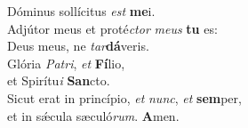 \oddverse Dóminus sollícitus \textit{est} \textbf{me}i.\\
\evenverse Adjútor meus et proté\textit{ctor} \textit{me}\textit{us} \textbf{tu} es:~\*\\
\evenverse Deus meus, ne \textit{tar}\textbf{dá}veris.\\
\oddverse Glória \textit{Pa}\textit{tri}, \textit{et} \textbf{Fí}lio,~\*\\
\oddverse et Spirítu\textit{i} \textbf{San}cto.\\
\evenverse Sicut erat in princípio, \textit{et} \textit{nunc}, \textit{et} \textbf{sem}per,~\*\\
\evenverse et in sǽcula sæculó\textit{rum}. \textbf{A}men.\\
